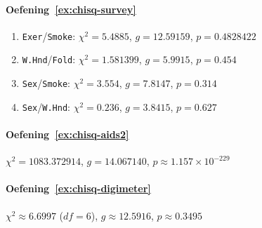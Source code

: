 \paragraph{Oefening~\ref{ex:chisq-survey}}

\begin{enumerate}
  \item \texttt{Exer}/\texttt{Smoke}: $\chi^2 = 5.4885$, $g = 12.59159$, $p = 0.4828422$
  \item \texttt{W.Hnd}/\texttt{Fold}: $\chi^2 = 1.581399$, $g = 5.9915$, $p = 0.454$
  \item \texttt{Sex}/\texttt{Smoke}: $\chi^2 = 3.554$, $g = 7.8147$, $p = 0.314$
  \item \texttt{Sex}/\texttt{W.Hnd}: $\chi^2 = 0.236$, $g = 3.8415$, $p = 0.627$
\end{enumerate}

\paragraph{Oefening~\ref{ex:chisq-aids2}} $\chi^2 = 1083.372914$, $g = 14.067140$, $p \approx 1.157 \times 10^{-229}$

\paragraph{Oefening~\ref{ex:chisq-digimeter}} $\chi^2 \approx 6.6997$ ($df = 6$), $g \approx 12.5916$, $p \approx 0.3495$
